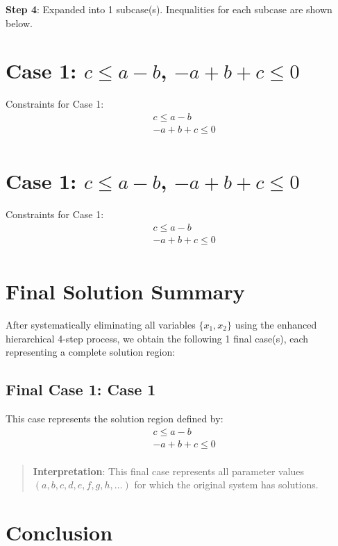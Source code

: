 \documentclass{article}
\newenvironment{stepdetail}
  {\begin{quote}\small\color{blue}}
  {\end{quote}}
\begin{document}
\textbf{Step 4}: Expanded into 1 subcase(s). Inequalities for each subcase are shown below.

\section{Case 1: $c \leq a - b$, $- a + b + c \leq 0$}

Constraints for Case 1:
\begin{align}
& c \leq a - b \\
& - a + b + c \leq 0 \\
\end{align}

\section{Case 1: $c \leq a - b$, $- a + b + c \leq 0$}

Constraints for Case 1:
\begin{align}
& c \leq a - b \\
& - a + b + c \leq 0 \\
\end{align}

\section{Final Solution Summary}

After systematically eliminating all variables $\{x_{1}, x_{2}\}$
using the enhanced hierarchical 4-step process, we obtain the following
1 final case(s), each representing a complete solution region:

\subsection{Final Case 1: Case 1}

This case represents the solution region defined by:
\begin{align}
& c \leq a - b \\
& - a + b + c \leq 0 \\
\end{align}

\begin{stepdetail}
\textbf{Interpretation}: This final case represents all parameter values
$(a, b, c, d, e, f, g, h, \ldots)$ for which the original system has solutions.
\end{stepdetail}

\section{Conclusion}
\end{document}
